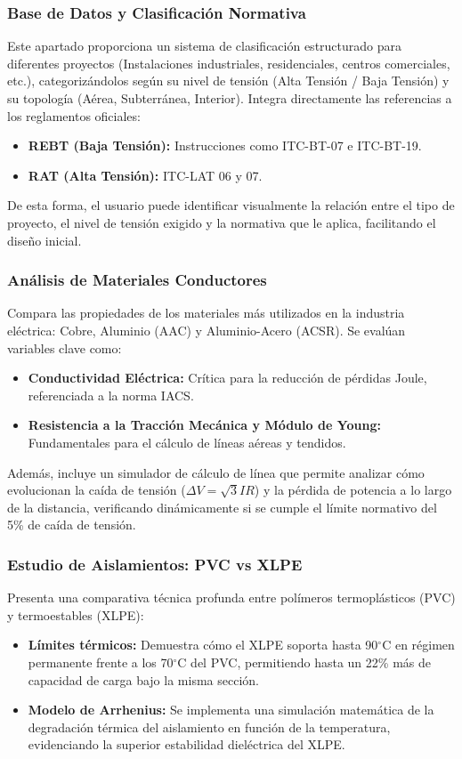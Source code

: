 \documentclass[11pt,a4paper]{article}
\begin{document}
\subsubsection{Base de Datos y Clasificación Normativa}
Este apartado proporciona un sistema de clasificación estructurado para diferentes proyectos (Instalaciones industriales, residenciales, centros comerciales, etc.), categorizándolos según su nivel de tensión (Alta Tensión / Baja Tensión) y su topología (Aérea, Subterránea, Interior). Integra directamente las referencias a los reglamentos oficiales:
\begin{itemize}
    \item \textbf{REBT (Baja Tensión):} Instrucciones como ITC-BT-07 e ITC-BT-19.
    \item \textbf{RAT (Alta Tensión):} ITC-LAT 06 y 07.
\end{itemize}
De esta forma, el usuario puede identificar visualmente la relación entre el tipo de proyecto, el nivel de tensión exigido y la normativa que le aplica, facilitando el diseño inicial.

\subsubsection{Análisis de Materiales Conductores}
Compara las propiedades de los materiales más utilizados en la industria eléctrica: Cobre, Aluminio (AAC) y Aluminio-Acero (ACSR). Se evalúan variables clave como:
\begin{itemize}
    \item \textbf{Conductividad Eléctrica:} Crítica para la reducción de pérdidas Joule, referenciada a la norma IACS.
    \item \textbf{Resistencia a la Tracción Mecánica y Módulo de Young:} Fundamentales para el cálculo de líneas aéreas y tendidos.
\end{itemize}
Además, incluye un simulador de cálculo de línea que permite analizar cómo evolucionan la caída de tensión ($\Delta V = \sqrt{3} I R$) y la pérdida de potencia a lo largo de la distancia, verificando dinámicamente si se cumple el límite normativo del 5\% de caída de tensión.

\subsubsection{Estudio de Aislamientos: PVC vs XLPE}
Presenta una comparativa técnica profunda entre polímeros termoplásticos (PVC) y termoestables (XLPE):
\begin{itemize}
    \item \textbf{Límites térmicos:} Demuestra cómo el XLPE soporta hasta 90$^\circ$C en régimen permanente frente a los 70$^\circ$C del PVC, permitiendo hasta un 22\% más de capacidad de carga bajo la misma sección.
    \item \textbf{Modelo de Arrhenius:} Se implementa una simulación matemática de la degradación térmica del aislamiento en función de la temperatura, evidenciando la superior estabilidad dieléctrica del XLPE.
\end{itemize}
\end{document}
